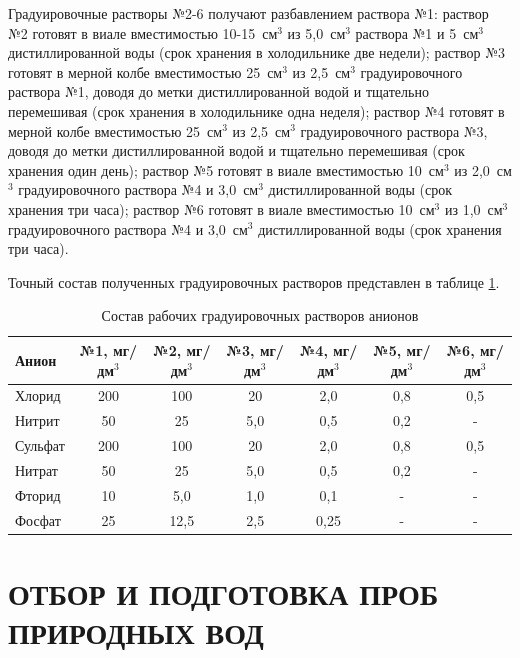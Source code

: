 Градуировочные растворы №2-6 получают разбавлением раствора №1: раствор №2 готовят в виале вместимостью 10-15~см$^3$ из 5,0~см$^3$ раствора №1 и 5~см$^3$ дистиллированной воды (срок хранения в холодильнике две недели); раствор №3 готовят в мерной колбе вместимостью 25~см$^3$ из 2,5~см$^3$ градуировочного раствора №1, доводя до метки дистиллированной водой и тщательно перемешивая (срок хранения в холодильнике одна неделя); раствор №4 готовят в мерной колбе вместимостью 25~см$^3$ из 2,5~см$^3$ градуировочного раствора №3, доводя до метки дистиллированной водой и тщательно перемешивая (срок хранения один день); раствор №5 готовят в виале вместимостью 10~см$^3$ из 2,0~см$^3$ градуировочного раствора №4 и 3,0~см$^3$ дистиллированной воды (срок хранения три часа); раствор №6 готовят в виале вместимостью 10~см$^3$ из 1,0~см$^3$ градуировочного раствора №4 и 3,0~см$^3$ дистиллированной воды (срок хранения три часа).

Точный состав полученных градуировочных растворов представлен в таблице \ref{tab:grad_solutions}.

\begin{table}[H]
\centering
\caption{Состав рабочих градуировочных растворов анионов}
\label{tab:grad_solutions}
\begin{tabular}{|l|c|c|c|c|c|c|}
\hline
Анион & №1, мг/дм$^3$ & №2, мг/дм$^3$ & №3, мг/дм$^3$ & №4, мг/дм$^3$ & №5, мг/дм$^3$ & №6, мг/дм$^3$ \\ \hline
Хлорид                         & 200  & 100  & 20  & 2,0  & 0,8  & 0,5  \\ \hline
Нитрит                         & 50   & 25   & 5,0 & 0,5  & 0,2  & -  \\ \hline
Сульфат                        & 200  & 100  & 20  & 2,0  & 0,8  & 0,5  \\ \hline
Нитрат                         & 50   & 25   & 5,0 & 0,5  & 0,2  & -  \\ \hline
Фторид                         & 10   & 5,0  & 1,0 & 0,1  & -  & -  \\ \hline
Фосфат                         & 25   & 12,5 & 2,5 & 0,25 & -  & -  \\ \hline
\end{tabular}
\end{table}

\section{ОТБОР И ПОДГОТОВКА ПРОБ ПРИРОДНЫХ ВОД}

